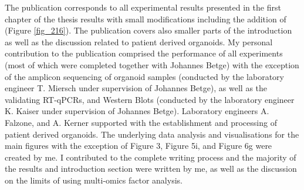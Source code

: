 \begin{flushleft}
\bigbreak
The publication corresponds to all experimental results presented in the first chapter of the thesis results with small modifications including the addition of (Figure \ref{fig_216}). The publication covers also smaller parts of the introduction as well as the discussion related to patient derived organoids. My personal contribution to the publication comprised the performance of all experiments (most of which were completed together with Johannes Betge) with the exception of the amplicon sequencing of organoid samples (conducted by the laboratory engineer T. Miersch under supervision of Johannes Betge), as well as the validating RT-qPCRs, and Western Blots (conducted by the laboratory engineer K. Kaiser under supervision of Johannes Betge). Laboratory engineers A. Falzone, and A. Kerner supported with the establishment and processing of patient derived organoids. The underlying data analysis and visualisations for the main figures with the exception of Figure 3, Figure 5i, and Figure 6g were created by me. I contributed to the complete writing process and the majority of the results and introduction section were written by me, as well as the discussion on the limits of using multi-omics factor analysis.


\newpage


\end{flushleft}
